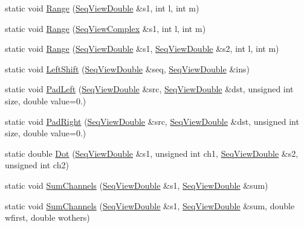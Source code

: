 \begin{Indent}
\begin{DoxyCompactItemize}
static void \hyperlink{classtsa_1_1_view_util_aee8e21e108474a2ca656868f1a32357f}{Range} (\hyperlink{namespacetsa_ac599574bcc094eda25613724b8f3ca9e}{Seq\+View\+Double} \&s1, int l, int m)
\item 
static void \hyperlink{classtsa_1_1_view_util_a71ef0446b7182b629144446bf25c0301}{Range} (\hyperlink{namespacetsa_ab32775c889b53c40fa83939f22372b75}{Seq\+View\+Complex} \&s1, int l, int m)
\item 
static void \hyperlink{classtsa_1_1_view_util_afd5ccdb844e5e7b0d3b6ff6668b1114f}{Range} (\hyperlink{namespacetsa_ac599574bcc094eda25613724b8f3ca9e}{Seq\+View\+Double} \&s1, \hyperlink{namespacetsa_ac599574bcc094eda25613724b8f3ca9e}{Seq\+View\+Double} \&s2, int l, int m)
\item 
static void \hyperlink{classtsa_1_1_view_util_a2b338186c5f8662d0b3c05706c35d54a}{Left\+Shift} (\hyperlink{namespacetsa_ac599574bcc094eda25613724b8f3ca9e}{Seq\+View\+Double} \&seq, \hyperlink{namespacetsa_ac599574bcc094eda25613724b8f3ca9e}{Seq\+View\+Double} \&ins)
\item 
static void \hyperlink{classtsa_1_1_view_util_a98044d73147e95de0cd82fd4e131d3ca}{Pad\+Left} (\hyperlink{namespacetsa_ac599574bcc094eda25613724b8f3ca9e}{Seq\+View\+Double} \&src, \hyperlink{namespacetsa_ac599574bcc094eda25613724b8f3ca9e}{Seq\+View\+Double} \&dst, unsigned int size, double value=0.)
\item 
static void \hyperlink{classtsa_1_1_view_util_a8593e792009543c7d21af6bdeea8f3d3}{Pad\+Right} (\hyperlink{namespacetsa_ac599574bcc094eda25613724b8f3ca9e}{Seq\+View\+Double} \&src, \hyperlink{namespacetsa_ac599574bcc094eda25613724b8f3ca9e}{Seq\+View\+Double} \&dst, unsigned int size, double value=0.)
\item 
static double \hyperlink{classtsa_1_1_view_util_a828f66a78c3084e7e0a56b7e05e3b0fc}{Dot} (\hyperlink{namespacetsa_ac599574bcc094eda25613724b8f3ca9e}{Seq\+View\+Double} \&s1, unsigned int ch1, \hyperlink{namespacetsa_ac599574bcc094eda25613724b8f3ca9e}{Seq\+View\+Double} \&s2, unsigned int ch2)
\item 
static void \hyperlink{classtsa_1_1_view_util_ae115581e15bfd8b5039e88a0685580b2}{Sum\+Channels} (\hyperlink{namespacetsa_ac599574bcc094eda25613724b8f3ca9e}{Seq\+View\+Double} \&s1, \hyperlink{namespacetsa_ac599574bcc094eda25613724b8f3ca9e}{Seq\+View\+Double} \&sum)
\item 
static void \hyperlink{classtsa_1_1_view_util_a5e5e15a409ca42fa35967f682fd73894}{Sum\+Channels} (\hyperlink{namespacetsa_ac599574bcc094eda25613724b8f3ca9e}{Seq\+View\+Double} \&s1, \hyperlink{namespacetsa_ac599574bcc094eda25613724b8f3ca9e}{Seq\+View\+Double} \&sum, double wfirst, double wothers)

\end{DoxyCompactItemize}
\end{Indent}
